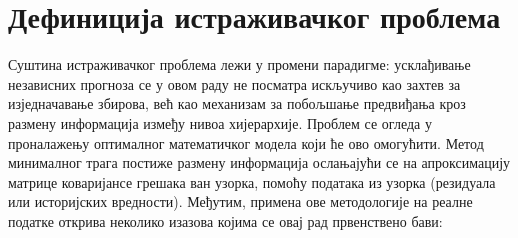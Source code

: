 \documentclass[12pt,oneside]{memoir}
\begin{document}
\section{Дефиниција истраживачког проблема}

Суштина истраживачког проблема лежи у промени парадигме: усклађивање независних прогноза се у овом раду не посматра искључиво као захтев за изједначавање збирова, већ као механизам за побољшање предвиђања кроз размену информација између нивоа хијерархије. Проблем се огледа у проналажењу оптималног математичког модела који ће ово омогућити. Метод минималног трага постиже размену информација ослањајући се на апроксимацију матрице коваријансе грешака ван узорка, помоћу података из узорка (резидуала или историјских вредности). Међутим, примена ове методологије на реалне податке открива неколико изазова којима се овај рад првенствено бави:
\end{document}

